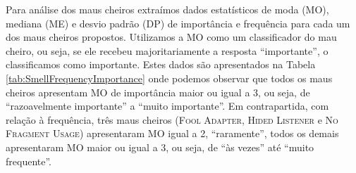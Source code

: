 Para análise dos maus cheiros extraímos dados estatísticos de moda (MO), mediana (ME) e desvio padrão (DP) de importância e frequência para cada um dos maus cheiros propostos. Utilizamos a MO como um classificador do mau cheiro, ou seja, se ele recebeu majoritariamente a resposta ``importante'', o classificamos como importante. Estes dados são apresentados na Tabela \ref{tab:SmellFrequencyImportance} onde podemos observar que todos os maus cheiros apresentam MO de importância maior ou igual a 3, ou seja, de ``razoavelmente importante'' a ``muito importante''. Em contrapartida, com relação à frequência, três maus cheiros (\textsc{\small Fool Adapter}, \textsc{\small Hided Listener} e \textsc{\small No Fragment Usage}) apresentaram MO igual a 2, ``raramente'', todos os demais apresentaram MO maior ou igual a 3, ou seja, de ``às vezes'' até ``muito frequente''.


